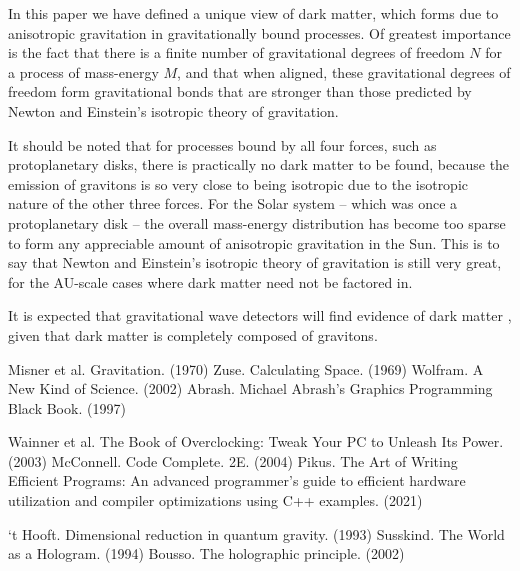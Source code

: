 \documentclass[12pt]{article}
\begin{document}
{In this paper we have defined a unique view of dark matter, which forms due to anisotropic gravitation in gravitationally bound processes.
Of greatest importance is the fact that there is a finite number of gravitational degrees of freedom $N$ for a process of mass-energy $M$, and that when aligned, these gravitational degrees of freedom form gravitational bonds that are stronger than those predicted by Newton and Einstein's isotropic theory of gravitation.

It should be noted that for processes bound by all four forces, such as protoplanetary disks, there is practically no dark matter to be found, because the emission of gravitons is so very close to being isotropic due to the isotropic nature of the other three forces.
For the Solar system -- which was once a protoplanetary disk -- the overall mass-energy distribution has become too sparse to form any appreciable amount of anisotropic gravitation in the Sun.
This is to say that Newton and Einstein's isotropic theory of gravitation is still very great, for the AU-scale cases where dark matter need not be factored in.

It is expected that gravitational wave detectors will find evidence of dark matter \cite{LIGO}, given that dark matter is completely composed of gravitons.







\pagebreak





\begin{thebibliography}{9}
 Misner et al. Gravitation. (1970)
 Zuse. Calculating Space. (1969)
 Wolfram. A New Kind of Science. (2002)
 Abrash. Michael Abrash's Graphics Programming Black Book. (1997)

 Wainner et al. The Book of Overclocking: Tweak Your PC to Unleash Its Power. (2003)
 McConnell. Code Complete. 2E. (2004)
 Pikus. The Art of Writing Efficient Programs: An advanced programmer's guide to efficient hardware utilization and compiler optimizations using C++ examples. (2021)


 `t Hooft. Dimensional reduction in quantum gravity. (1993)
 Susskind. The World as a Hologram. (1994)
 Bousso. The holographic principle. (2002)


\end{thebibliography}}
\end{document}
